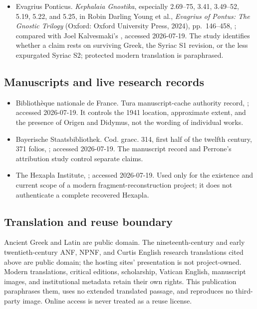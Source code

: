 \begin{itemize}
Byzantium on the Pre-Existence of the Soul,'' \emph{Journal for Late Antique
Religion and Culture} 8 (2014): 46--67,
. Used to control the distance between Cyril's party labels, Evagrian
text, and surviving arguments.
\item Evagrius Ponticus. \emph{Kephalaia Gnostika}, especially 2.69--75,
3.41, 3.49--52, 5.19, 5.22, and 5.25, in Robin Darling Young et al.,
\emph{Evagrius of Pontus: The Gnostic Trilogy} (Oxford: Oxford University
Press, 2024), pp.~146--458,
;
compared with Joel Kalvesmaki's
,
accessed 2026-07-19. The study identifies whether a claim rests on surviving
Greek, the Syriac S1 revision, or the less expurgated Syriac S2; protected
modern translation is paraphrased.
\end{itemize}

\subsection{Manuscripts and live research records}

\begin{itemize}
\item Biblioth\`eque nationale de France. Tura manuscript-cache authority
record,
;
accessed 2026-07-19. It controls the 1941 location, approximate extent, and the
presence of Origen and Didymus, not the wording of individual works.
\item Bayerische Staatsbibliothek. Cod. graec. 314, first half of the twelfth
century, 371 folios,
; accessed 2026-07-19. The manuscript record and Perrone's attribution
study control separate claims.
\item The Hexapla Institute,
; accessed 2026-07-19. Used
only for the existence and current scope of a modern fragment-reconstruction
project; it does not authenticate a complete recovered Hexapla.
\end{itemize}

\subsection{Translation and reuse boundary}

Ancient Greek and Latin are public domain. The nineteenth-century and early
twentieth-century ANF, NPNF, and Curtis English research translations cited
above are public domain; the hosting sites' presentation is not project-owned.
Modern translations, critical editions, scholarship, Vatican English,
manuscript images, and institutional metadata retain their own rights. This
publication paraphrases them, uses no extended translated passage, and
reproduces no third-party image. Online access is never treated as a reuse
license.

\endgroup
